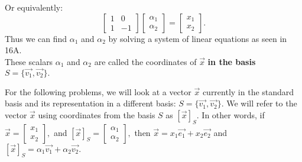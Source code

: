 Or equivalently:
\[
  \begin{bmatrix}
    1 & 0 \\
    1 & -1
  \end{bmatrix}
  \begin{bmatrix} \alpha_1 \\ \alpha_2 \end{bmatrix} = \begin{bmatrix} x_1 \\ x_2 \end{bmatrix}
.\]
Thus we can find $\alpha_1$ and $\alpha_2$ by solving a system of linear equations as seen in 16A. \\
These scalars $\alpha_1$ and $\alpha_2$ are called the coordinates of $\vec{x}$ \textbf{in the basis} $S = \{\vec{v_1}, \vec{v_2} \}.$

For the following problems, we will look at a vector $\vec{x}$ currently in the standard basis 
and its representation in a different basis: $S = \{\vec{v_1}, \vec{v_2} \}.$ \vskip 4pt
We will refer to the vector $\vec{x}$ using coordinates from the basis $S$ as $[\vec{x}]_S.$ In other words, \vskip 3pt 
if $\vec{x} = \begin{bmatrix} x_1 \\ x_2 \end{bmatrix},$ and $[\vec{x}]_S = \begin{bmatrix} \alpha_1 \\ \alpha_2 \end{bmatrix},$ then $\vec{x} = x_1 \vec{e_1} + x_2 \vec{e_2}$ and $[\vec{x}]_S = \alpha_1 \vec{v_1} + \alpha_2 \vec{v_2}.$

